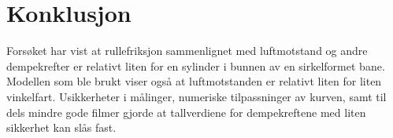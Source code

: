 \section{Konklusjon}
Forsøket har vist at rullefriksjon sammenlignet med luftmotstand og andre dempekrefter er relativt liten for en sylinder i bunnen av en sirkelformet bane. 
Modellen som ble brukt viser også at luftmotstanden er relativt liten for liten vinkelfart. Usikkerheter i målinger, numeriske tilpassninger av kurven, samt til dels mindre gode filmer gjorde at tallverdiene for dempekreftene med liten sikkerhet kan slås fast.
